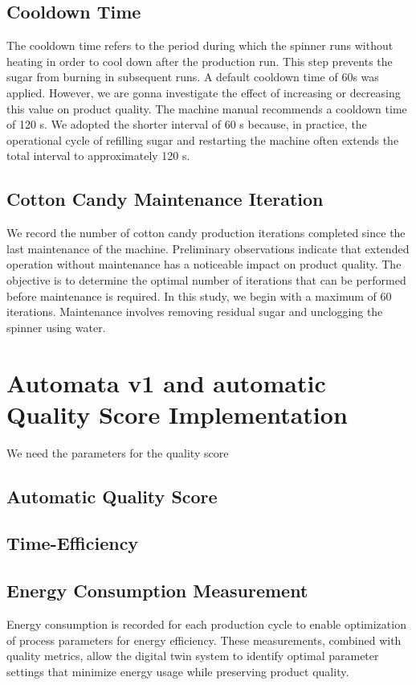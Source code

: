 \subsection{Cooldown Time}
The cooldown time refers to the period during which the spinner runs without heating in order to cool down after the production run. This step prevents the sugar from burning in subsequent runs. A default cooldown time of 60s was applied. However, we are gonna investigate the effect of increasing or decreasing this value on product quality. The machine manual recommends a cooldown time of 120 s. We adopted the shorter interval of 60 s because, in practice, the operational cycle of refilling sugar and restarting the machine often extends the total interval to approximately 120 s.

\subsection{Cotton Candy Maintenance Iteration}
We record the number of cotton candy production iterations completed since the last maintenance of the machine. Preliminary observations indicate that extended operation without maintenance has a noticeable impact on product quality. The objective is to determine the optimal number of iterations that can be performed before maintenance is required. In this study, we begin with a maximum of 60 iterations. Maintenance involves removing residual sugar and unclogging the spinner using water.



\section{Automata v1 and automatic Quality Score Implementation}
We need the parameters for the quality score
\subsection{Automatic Quality Score}
\subsection{Time-Efficiency}
\subsection{Energy Consumption Measurement}
\label{sec:energy-measurement}

Energy consumption is recorded for each production cycle to enable optimization of process parameters for energy efficiency. These measurements, combined with quality metrics, allow the digital twin system to identify optimal parameter settings that minimize energy usage while preserving product quality.

